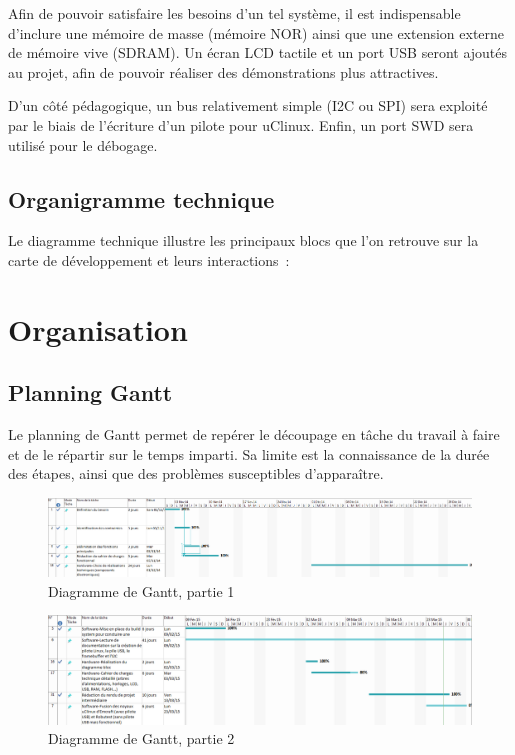        Afin de pouvoir satisfaire les besoins d'un tel système, il est indispensable d'inclure une mémoire de masse (mémoire NOR) ainsi que une extension externe de mémoire vive (SDRAM).
        Un écran LCD tactile et un port USB seront ajoutés au projet, afin de pouvoir réaliser des démonstrations plus attractives.
       
       	D'un côté pédagogique, un bus relativement simple (I2C ou SPI) sera exploité par le biais de l'écriture d'un pilote pour uClinux.
    	Enfin, un port SWD sera utilisé pour le débogage.
        
    \subsection{Organigramme technique}
    	Le diagramme technique illustre les principaux blocs que l'on retrouve sur la carte de développement et leurs interactions~:
      	
      
\section{Organisation}
	\subsection{Planning Gantt}
    	Le planning de Gantt permet de repérer le découpage en tâche du travail à faire et de le répartir sur le temps imparti.
        Sa limite est la connaissance de la durée des étapes, ainsi que des problèmes susceptibles d'apparaître.
    
	    \begin{figure}[H]
			\centering
            \includegraphics[angle=90,scale=0.33]{Gantt/gantt1.png}
            \caption{Diagramme de Gantt, partie 1}
		\end{figure}
        
	    \begin{figure}[H]
			\centering                    
    	    \includegraphics[angle=90,scale=0.5]{Gantt/gantt2.png}
            \caption{Diagramme de Gantt, partie 2}
		\end{figure}

